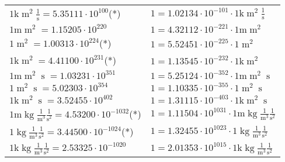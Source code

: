 \begin{center}
\begin{longtable}{l l}
{\color{gray}$1 \bm{\mathrm{ k}}{\operatorname{m}^2}\frac1{\operatorname{s}}{}{} = 5.35111\cdot10^{100} $}\quad(*) & {\color{gray}$ 1 = 1.02134\cdot10^{-101} \cdot 1 \bm{\mathrm{ k}}{\operatorname{m}^2}\frac1{\operatorname{s}}{}{}$}  \\
{\color{gray}$1 \bm{\mathrm{ m}}{\operatorname{m}^2}{}{}{} = 1.15205\cdot10^{220} $}   & {\color{gray}$ 1 = 4.32112\cdot10^{-221} \cdot 1 \bm{\mathrm{ m}}{\operatorname{m}^2}{}{}{}$}  \\
{\color{black}$1 \bm{\mathrm{ }}{\operatorname{m}^2}{}{}{} = 1.00313\cdot10^{224} $}\quad(*) & {\color{black}$ 1 = 5.52451\cdot10^{-225} \cdot 1 \bm{\mathrm{ }}{\operatorname{m}^2}{}{}{}$}  \\
{\color{gray}$1 \bm{\mathrm{ k}}{\operatorname{m}^2}{}{}{} = 4.41100\cdot10^{231} $}\quad(*) & {\color{gray}$ 1 = 1.13545\cdot10^{-232} \cdot 1 \bm{\mathrm{ k}}{\operatorname{m}^2}{}{}{}$}  \\
{\color{gray}$1 \bm{\mathrm{ m}}{\operatorname{m}^2}{\operatorname{s}}{}{} = 1.03231\cdot10^{351} $}   & {\color{gray}$ 1 = 5.25124\cdot10^{-352} \cdot 1 \bm{\mathrm{ m}}{\operatorname{m}^2}{\operatorname{s}}{}{}$}  \\
{\color{black}$1 \bm{\mathrm{ }}{\operatorname{m}^2}{\operatorname{s}}{}{} = 5.02303\cdot10^{354} $}   & {\color{black}$ 1 = 1.10335\cdot10^{-355} \cdot 1 \bm{\mathrm{ }}{\operatorname{m}^2}{\operatorname{s}}{}{}$}  \\
{\color{gray}$1 \bm{\mathrm{ k}}{\operatorname{m}^2}{\operatorname{s}}{}{} = 3.52455\cdot10^{402} $}   & {\color{gray}$ 1 = 1.31115\cdot10^{-403} \cdot 1 \bm{\mathrm{ k}}{\operatorname{m}^2}{\operatorname{s}}{}{}$}  \\
\hline{\color{gray}$1 \bm{\mathrm{ m}}\operatorname{kg}\frac1{\operatorname{m}^3}\frac1{\operatorname{s}^2}{}{} = 4.53200\cdot10^{-1032} $}\quad(*) & {\color{gray}$ 1 = 1.11504\cdot10^{1031} \cdot 1 \bm{\mathrm{ m}}\operatorname{kg}\frac1{\operatorname{m}^3}\frac1{\operatorname{s}^2}{}{}$}  \\
{\color{black}$1 \bm{\mathrm{ }}\operatorname{kg}\frac1{\operatorname{m}^3}\frac1{\operatorname{s}^2}{}{} = 3.44500\cdot10^{-1024} $}\quad(*) & {\color{black}$ 1 = 1.32455\cdot10^{1023} \cdot 1 \bm{\mathrm{ }}\operatorname{kg}\frac1{\operatorname{m}^3}\frac1{\operatorname{s}^2}{}{}$}  \\
{\color{gray}$1 \bm{\mathrm{ k}}\operatorname{kg}\frac1{\operatorname{m}^3}\frac1{\operatorname{s}^2}{}{} = 2.53325\cdot10^{-1020} $}   & {\color{gray}$ 1 = 2.01353\cdot10^{1015} \cdot 1 \bm{\mathrm{ k}}\operatorname{kg}\frac1{\operatorname{m}^3}\frac1{\operatorname{s}^2}{}{}$}  \\

\end{longtable}
\end{center}
